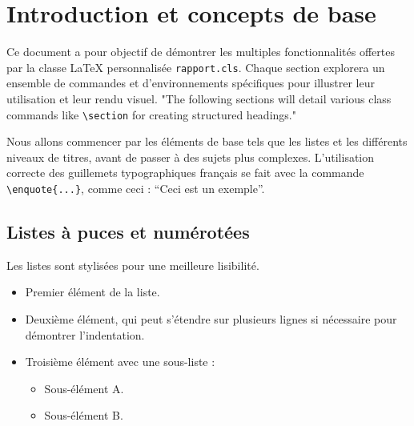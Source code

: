 \documentclass{butex}
\begin{document}
\fairepagedegarde

\fairemarges


\tabledematieres

\section{Introduction et concepts de base}

Ce document a pour objectif de démontrer les multiples fonctionnalités offertes par la classe \LaTeX{} personnalisée \texttt{rapport.cls}. Chaque section explorera un ensemble de commandes et d'environnements spécifiques pour illustrer leur utilisation et leur rendu visuel.
"The following sections will detail various class commands like \texttt{\textbackslash section} for creating structured headings."

Nous allons commencer par les éléments de base tels que les listes et les différents niveaux de titres, avant de passer à des sujets plus complexes. L'utilisation correcte des guillemets typographiques français se fait avec la commande \verb|\enquote{...}|, comme ceci : \enquote{Ceci est un exemple}.

\subsection{Listes à puces et numérotées}

Les listes sont stylisées pour une meilleure lisibilité.

\begin{itemize}
	\item Premier élément de la liste.
	\item Deuxième élément, qui peut s'étendre sur plusieurs lignes si nécessaire pour démontrer l'indentation.
	\item Troisième élément avec une sous-liste :
	\begin{itemize}
		\item Sous-élément A.
		\item Sous-élément B.
	\end{itemize}
\end{itemize}
\end{document}
